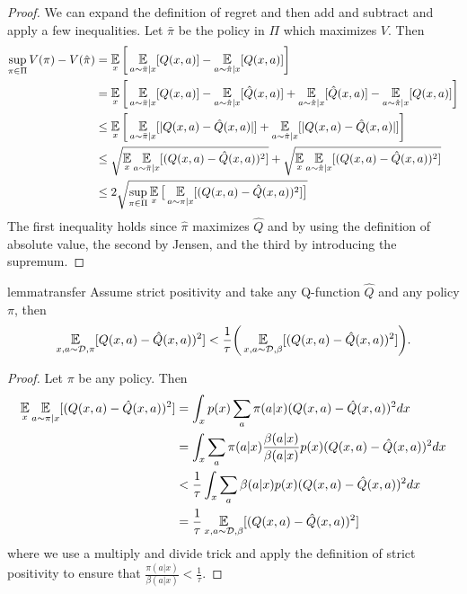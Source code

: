 \begin{subappendices}
\begin{proof}
We can expand the definition of regret and then add and subtract and apply a few inequalities. Let $ \bar \pi $ be the policy in $ \Pi $ which maximizes $ V$. Then
\begin{align}
    \sup_{\pi\in \Pi}V(\pi) - V(\hat \pi) &=  \E_x\bigg[\E_{a\sim \bar\pi|x}[Q(x,a)] - \E_{a\sim\hat\pi|x}[Q(x,a)]\bigg]\\
    &= \E_x\bigg[\E_{a\sim \bar\pi|x}[ Q(x,a)] - \E_{a\sim\hat\pi|x}[\hat Q(x,a)] + \E_{a\sim\hat\pi|x}[\hat Q(x,a)] - \E_{a\sim\hat\pi|x}[Q(x,a)]\bigg]\\
    &\leq \E_x\bigg[\E_{a\sim \bar\pi|x}[| Q(x,a) -\hat Q(x,a)|] + \E_{a\sim\hat\pi|x}[|Q(x,a)-\hat Q(x,a)|]\bigg]\\
    &\leq \sqrt{\E_x\E_{a\sim \bar\pi|x}[(Q(x,a) -\hat Q(x,a))^2]} + \sqrt{\E_x\E_{a\sim \hat\pi|x}[(Q(x,a) -\hat Q(x,a))^2]} \\
    &\leq 2  \sqrt{ \sup_{\pi\in \Pi}\E_x\big[\E_{a\sim \pi|x}[(Q(x,a)-  \hat Q(x,a))^2]\big]}
\end{align}
The first inequality holds since $ \hat \pi $ maximizes $ \hat Q$ and by using the definition of absolute value, the second by Jensen, and the third by introducing the supremum.
\end{proof}

\begin{restatable}{lemma}{transfer}\label{lem:transfer}
Assume strict positivity and take any Q-function $ \hat Q $ and any policy $ \pi$, then
\begin{align}
    \E_{x, a\sim \mathcal{D}, \pi}[Q(x,a) - \hat Q(x,a))^2] < \frac{1}{\tau}\bigg(\E_{x,a \sim \mathcal{D}, \beta}[(Q(x,a) - \hat Q(x,a))^2]\bigg).
\end{align}
\end{restatable}
\begin{proof} Let $ \pi$ be any policy. Then
\begin{align}
    \E_{x}\E_{a\sim \pi|x} [(Q(x,a) - \hat Q(x,a))^2] &=  \int_x p(x) \sum_a \pi(a|x) (Q(x,a) - \hat Q(x,a))^2 dx \\
    &=  \int_x \sum_a \pi(a|x) \frac{\beta(a|x)}{\beta(a|x)} p(x) (Q(x,a) - \hat Q(x,a))^2 dx \\
    &<  \frac{1}{\tau}\int_x \sum_a \beta(a|x) p(x) (Q(x,a) - \hat Q(x,a))^2 dx\\
    &= \frac{1}{\tau} \E_{x,a \sim \mathcal{D}, \beta}[(Q(x,a) - \hat Q(x,a))^2]
\end{align}
where we use a multiply and divide trick and apply the definition of strict positivity to ensure that $ \frac{\pi(a|x)}{\beta(a|x)} < \frac{1}{\tau}$.
\end{proof}



\end{subappendices}
